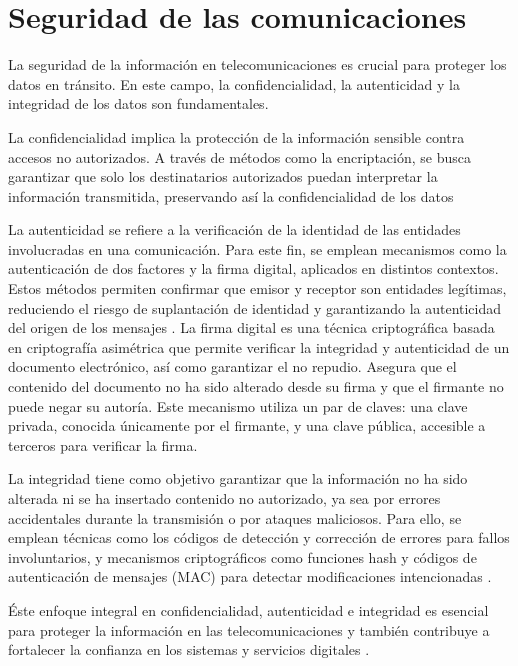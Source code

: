 \section{Seguridad de las comunicaciones}
\label{sec:segDeLasComun}
La seguridad de la información en telecomunicaciones es crucial para proteger los datos en tránsito. En este campo, la confidencialidad, la autenticidad y la integridad de los datos son fundamentales.

La confidencialidad implica la protección de la información sensible contra accesos no autorizados. A través de métodos como la encriptación, se busca garantizar que solo los destinatarios autorizados puedan interpretar la información transmitida, preservando así la confidencialidad de los datos \cite{stallings2016network}

La autenticidad se refiere a la verificación de la identidad de las entidades involucradas en una comunicación. Para este fin, se emplean mecanismos como la autenticación de dos factores y la firma digital, aplicados en distintos contextos. Estos métodos permiten confirmar que emisor y receptor son entidades legítimas, reduciendo el riesgo de suplantación de identidad y garantizando la autenticidad del origen de los mensajes \cite{stallings2016network}. La firma digital es una técnica criptográfica basada en criptografía asimétrica que permite verificar la integridad y autenticidad de un documento electrónico, así como garantizar el no repudio. Asegura que el contenido del documento no ha sido alterado desde su firma y que el firmante no puede negar su autoría. Este mecanismo utiliza un par de claves: una clave privada, conocida únicamente por el firmante, y una clave pública, accesible a terceros para verificar la firma.

La integridad tiene como objetivo garantizar que la información no ha sido alterada ni se ha insertado contenido no autorizado, ya sea por errores accidentales durante la transmisión o por ataques maliciosos. Para ello, se emplean técnicas como los códigos de detección y corrección de errores para fallos involuntarios, y mecanismos criptográficos como funciones hash y códigos de autenticación de mensajes (MAC) para detectar modificaciones intencionadas \cite{stallings2016network, delfsintroduction}.

Éste enfoque integral en confidencialidad, autenticidad e integridad es esencial para proteger la información en las telecomunicaciones y también contribuye a fortalecer la confianza en los sistemas y servicios digitales \cite{stallings2005cryptography,stallings2016network}.

